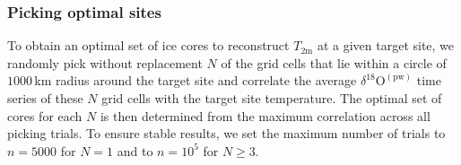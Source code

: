 \documentclass[cp, manuscript]{copernicus}
\begin{document}



\subsubsection{Picking optimal sites}\label{methods:picking}

To obtain an optimal set of ice cores to reconstruct $T_{2\mathrm{m}}$ at a
given target site, we randomly pick without replacement $N$ of the
grid cells that lie within a circle of $1000$\,km radius around the target site
and correlate the average $\delta^{18}\mathrm{O}^{\mathrm{(pw)}}$ time series of
these $N$ grid cells with the target site temperature. The optimal set of cores
for each $N$ is then determined from the maximum correlation across all picking
trials. To ensure stable results, we set the maximum number of trials to
$n=5000$ for $N=1$ and to $n=10^5$ for $N\geq3$.
\end{document}
